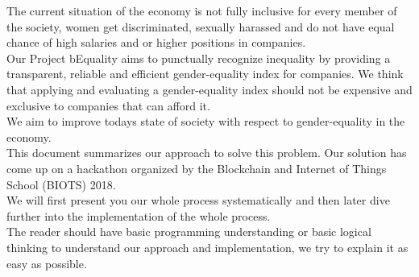 The current situation of the economy is not fully inclusive for every member of the society, women get discriminated, sexually harassed and do not have equal chance of high salaries and or higher positions in companies.\\
Our Project bEquality aims to punctually recognize inequality by providing a transparent, reliable and efficient gender-equality index for companies. We think that applying and evaluating a gender-equality index should not be expensive and exclusive to companies that can afford it.\\
We aim to improve todays state of society with respect to gender-equality in the economy.\\

This document summarizes our approach to solve this problem. Our solution has come up on a hackathon organized by the Blockchain and Internet of Things School (BIOTS) 2018.\\

We will first present you our whole process systematically and then later dive further into the implementation of the whole process.\\
The reader should have basic programming understanding or basic logical thinking to understand our approach and implementation, we try to explain it as easy as possible.

